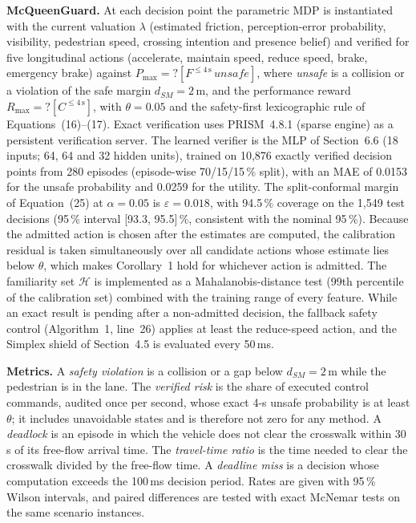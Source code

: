 \documentclass[11pt]{article}
\begin{document}
\textbf{McQueenGuard.} At each decision point the parametric MDP is instantiated with the current valuation $\lambda$ (estimated friction,
perception-error probability, visibility, pedestrian speed, crossing intention and presence belief) and verified for five longitudinal
actions (accelerate, maintain speed, reduce speed, brake, emergency brake) against $P_{\max}{=}?[F^{\le 4\,\mathrm{s}}\,\mathit{unsafe}]$,
where \emph{unsafe} is a collision or a violation of the safe margin $d_{SM}=2$\,m, and the performance reward
$R_{\max}{=}?[C^{\le 4\,\mathrm{s}}]$, with $\theta=0.05$ and the safety-first lexicographic rule of Equations~(16)--(17). Exact
verification uses PRISM~4.8.1 (sparse engine) as a persistent verification server. The learned verifier is the MLP of Section~6.6
(18 inputs; 64, 64 and 32 hidden units), trained on 10,876 exactly verified decision points from 280 episodes
(episode-wise 70/15/15\,\% split), with an MAE of 0.0153 for the unsafe probability and 0.0259 for the utility. The
split-conformal margin of Equation~(25) at $\alpha=0.05$ is $\varepsilon=0.018$, with 94.5\,\% coverage on the
1,549 test decisions (95\,\% interval [93.3, 95.5]\,\%, consistent with the nominal 95\,\%). Because the admitted action is chosen after the estimates are computed, the calibration residual is taken simultaneously over
all candidate actions whose estimate lies below $\theta$, which makes Corollary~1 hold for whichever action is admitted. The familiarity set
$\mathcal{H}$ is implemented as a Mahalanobis-distance test (99th percentile of the calibration set) combined with the training range of every
feature. While an exact result is pending after a non-admitted decision, the fallback safety control (Algorithm~1, line~26) applies at
least the reduce-speed action, and the Simplex shield of Section~4.5 is evaluated every 50\,ms.

\textbf{Metrics.} A \emph{safety violation} is a collision or a gap below $d_{SM}=2$\,m while the pedestrian is in the lane. The \emph{verified
risk} is the share of executed control commands, audited once per second, whose exact 4-s unsafe probability is at least $\theta$; it
includes unavoidable states and is therefore not zero for any method. A \emph{deadlock} is an episode in which the vehicle does not clear the
crosswalk within 30\,s of its free-flow arrival time. The \emph{travel-time ratio} is the time needed to clear the crosswalk divided by the
free-flow time. A \emph{deadline miss} is a decision whose computation exceeds the 100\,ms decision period. Rates are given with 95\,\%
Wilson intervals, and paired differences are tested with exact McNemar tests on the same scenario instances.
\end{document}
